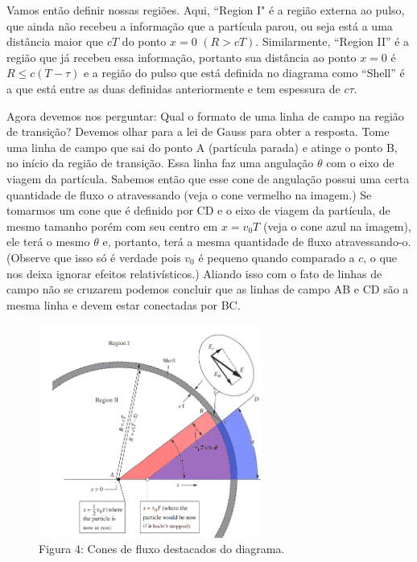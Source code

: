\documentclass[12pt, letterpaper]{article}
\begin{document}
    Vamos então definir nossas regiões. Aqui, ``Region I" é a região externa ao pulso, que ainda não recebeu a informação que a partícula parou, ou seja está a uma distância maior que $cT$ do ponto $x = 0$ $(R > cT)$. Similarmente, ``Region II'' é a região que já recebeu essa informação, portanto sua distância ao ponto $x = 0$ é $R \leq c(T - \tau)$ e a região do pulso que está definida no diagrama como ``Shell'' é a que está entre as duas definidas anteriormente e tem espessura de $c\tau$.

    Agora devemos nos perguntar: Qual o formato de uma linha de campo na região de transição? Devemos olhar para a lei de Gauss para obter a resposta. Tome uma linha de campo que sai do ponto A (partícula parada) e atinge o ponto B, no início da região de transição. Essa linha faz uma angulação $\theta$ com o eixo de viagem da partícula. Sabemos então que esse cone de angulação possui uma certa quantidade de fluxo o atravessando (veja o cone vermelho na imagem.) Se tomarmos um cone que é definido por CD e o eixo de viagem da partícula, de mesmo tamanho porém com seu centro em $x = v_0T$ (veja o cone azul na imagem), ele terá o mesmo $\theta$ e, portanto, terá a mesma quantidade de fluxo atravessando-o. (Observe que isso só é verdade pois $v_0$ é pequeno quando comparado a $c$, o que nos deixa ignorar efeitos relativísticos.) Aliando isso com o fato de linhas de campo não se cruzarem podemos concluir que as linhas de campo AB e CD são a mesma linha e devem estar conectadas por BC.

    \begin{figure}[H]
        \centering
        \includegraphics[width=0.65\textwidth]{highlight}
        \\{Figura 4: Cones de fluxo destacados do diagrama.}
        \label{fig:fig4}
    \end{figure}
\end{document}
